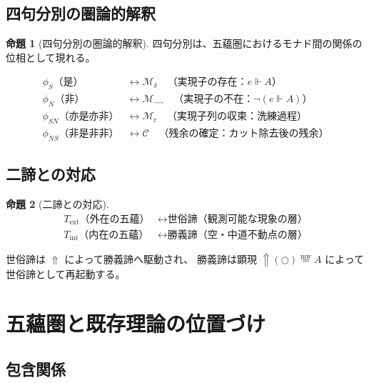 \documentclass[11pt,a4paper]{article}
\theoremstyle{definition}
\newtheorem{proposition}{命題}[section]
\newcommand{\Mdelta}{\mathcal{M}_{\delta}}
\newcommand{\Mneg}{\mathcal{M}_{\neg\neg}}
\newcommand{\Mr}{\mathcal{M}_{\mathrm{r}}}
\newcommand{\Mc}{\mathcal{C}}
\newcommand{\ext}{\mathrm{ext}}
\newcommand{\intn}{\mathrm{int}}
\newcommand{\TExt}{T_{\ext}}
\newcommand{\TInt}{T_{\intn}}
\begin{document}
\subsection{四句分別の圏論的解釈}

\begin{proposition}[四句分別の圏論的解釈]
四句分別は、五蘊圏におけるモナド間の関係の位相として現れる。

\begin{align}
\phi_S \text{（是）} &\longleftrightarrow \Mdelta 
\quad \text{（実現子の存在：} e \Vdash A \text{）} \\
\phi_N \text{（非）} &\longleftrightarrow \Mneg 
\quad \text{（実現子の不在：} \neg(e \Vdash A) \text{）} \\
\phi_{SN} \text{（亦是亦非）} &\longleftrightarrow \Mr 
\quad \text{（実現子列の収束：洗練過程）} \\
\phi_{NS} \text{（非是非非）} &\longleftrightarrow \Mc 
\quad \text{（残余の確定：カット除去後の残余）}
\end{align}
\end{proposition}

\subsection{二諦との対応}

\begin{proposition}[二諦との対応]
\begin{align}
\TExt \text{（外在の五蘊）} &\longleftrightarrow 
\text{世俗諦（観測可能な現象の層）} \\
\TInt \text{（内在の五蘊）} &\longleftrightarrow 
\text{勝義諦（空・中道不動点の層）}
\end{align}

世俗諦は $\Uparrow$ によって勝義諦へ駆動され、
勝義諦は顕現 $\Uparrow(\bigcirc) \stackrel{\mathrm{mw}}{=} A$ によって
世俗諦として再起動する。
\end{proposition}

\section{五蘊圏と既存理論の位置づけ}

\subsection{包含関係}
\end{document}

